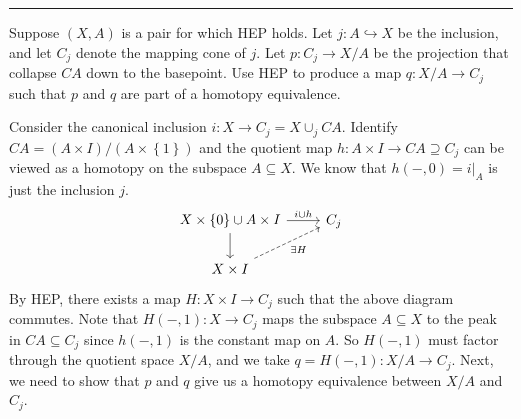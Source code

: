 \documentclass[a4paper, 12pt]{article}
\begin{document}
\noindent\rule{7in}{2.8pt}
\begin{problem}{5}
Suppose \((X,A)\) is a pair for which HEP holds. Let \(j:A\hookrightarrow X\) be the inclusion, and let \(C_j\) denote the mapping cone of \(j\). Let \(p:C_j\rightarrow X/A\) be the projection that 
collapse \(CA\) down to the basepoint. Use HEP to produce a map \(q:X/A\rightarrow C_j\) such that \(p\) and \(q\) are part of a homotopy equivalence.
\end{problem}
\begin{solution}
Consider the canonical inclusion \(i:X\rightarrow C_j=X\cup_j CA\). Identify \(CA=(A\times I)/(A\times \left\{ 1 \right\})\) and the quotient map 
\(h:A\times I\rightarrow CA\supseteq C_j\) can be viewed as a homotopy on the subspace \(A\subseteq X\). We know that \(h(-,0)=i|_A\) is just the inclusion \(j\). 
\[\begin{tikzcd}
	{X\times\left\{0\right\}\cup A\times I} & {C_j} \\
	{X\times I}
	\arrow["{i\cup h}", from=1-1, to=1-2]
	\arrow[from=1-1, to=2-1]
	\arrow["{\exists H}"', dashed, from=2-1, to=1-2]
\end{tikzcd}\]
By HEP, there exists a map \(H:X\times I\rightarrow C_j\) such that the above diagram commutes. Note that \(H(-,1):X\rightarrow C_j\) maps the subspace \(A\subseteq X\) to the peak in \(CA\subseteq C_j\) since 
\(h(-,1)\) is the constant map on \(A\). So \(H(-,1)\) must factor through the quotient space \(X/A\), and we take \(q=H(-,1):X/A\rightarrow C_j\). Next, we need to show that \(p\) and \(q\) give us a homotopy equivalence 
between \(X/A\) and \(C_j\).


\end{solution}
\end{document}
